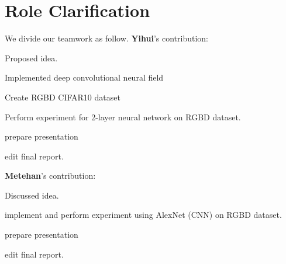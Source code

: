 \documentclass[10pt,twocolumn,letterpaper]{article}
\begin{document}
\section*{Role Clarification}
We divide our teamwork as follow. {\bf Yihui}'s contribution:
\begin{enumerate*}
\item Proposed idea.
\item Implemented deep convolutional neural field 
\item Create RGBD CIFAR10 dataset
\item Perform experiment for 2-layer neural network on RGBD dataset.
\item prepare presentation
\item edit final report.
\end{enumerate*}
{\bf Metehan}'s contribution:
\begin{enumerate*}
\item Discussed idea.
\item implement and perform experiment using AlexNet (CNN) on RGBD dataset. 
\item prepare presentation 
\item edit final report.
\end{enumerate*}

{\small
\printbibliography
}
\end{document}
